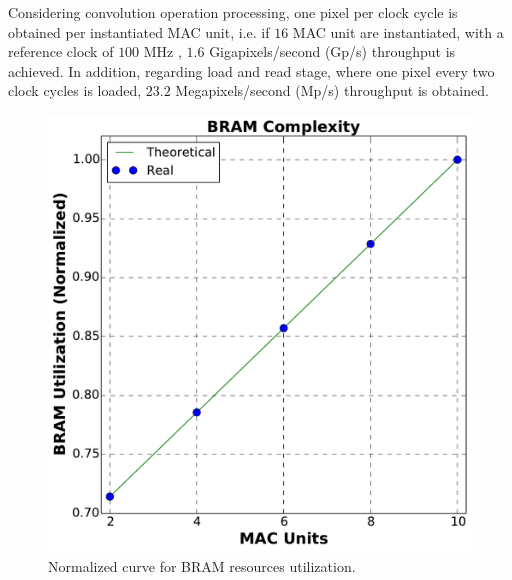 \documentclass[conference,compsoc]{IEEEtran}
\begin{document}
Considering convolution operation processing, one pixel per clock cycle is
obtained per instantiated MAC unit, i.e. if $16$ MAC unit are instantiated,
with a reference clock of $100$ MHz , $1.6$ Gigapixels/second (Gp/s) throughput
is achieved. In addition, regarding load and read stage, where one pixel every
two clock cycles is loaded, $23.2$ Megapixels/second (Mp/s) throughput is
obtained.

\begin{figure}[!t]
\centering
\includegraphics[scale=0.3]{BRAM_c2}
\caption{Normalized curve for BRAM resources utilization.}
\label{bram_n}
\end{figure}

%
%
\end{document}
